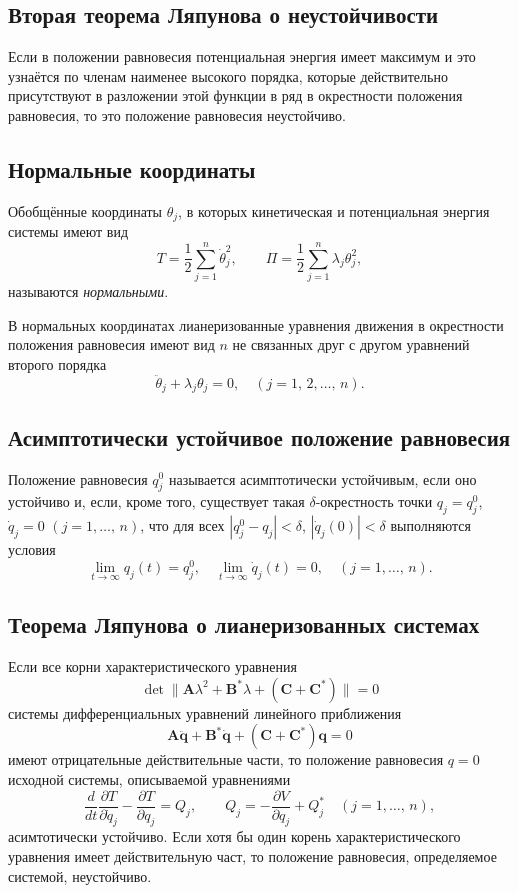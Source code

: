 \documentclass[a4paper,12pt]{article}
\begin{document}
\subsection{Вторая теорема Ляпунова о неустойчивости}
\begin{thm}[Ляпунова, 2-я]
	Если в положении равновесия потенциальная энергия имеет максимум и
	это узнаётся по членам наименее высокого порядка, которые действительно
	присутствуют в разложении этой функции в ряд в окрестности положения
	равновесия, то это положение равновесия неустойчиво.
\end{thm}
\subsection{Нормальные координаты}
\begin{dfn}
	Обобщённые координаты $\theta_j$, в которых кинетическая и потенциальная
	энергия системы имеют вид
	\[
		T=\frac{1}{2} \sum_{j=1}^{n} \dot{\theta}_j^2, \qquad
		\Pi=\frac{1}{2} \sum_{j=1}^{n} \lambda_j \theta_j^2,
	\]
	называются \emph{нормальными}.
\end{dfn}
В нормальных координатах лианеризованные уравнения движения в окрестности
положения равновесия имеют вид $n$ не связанных друг с другом уравнений
второго порядка
\[
	\ddot{\theta}_j+\lambda_j \theta_j =0, \quad (j =1,\,2,\ldots,\,n)
.\] 
\subsection{Асимптотически устойчивое положение равновесия}
\begin{dfn}
	Положение равновесия $q_j^0$ называется асимптотически устойчивым,
	если оно устойчиво и, если, кроме того, существует такая 
	$\delta$-окрестность точки $q_j=q_j^0$, $\dot{q}_j=0$ $(j=1,\ldots,\,n)$,
	что для всех $|q_j^0-q_j|<\delta$, $|\dot{q}_j(0)|< \delta$ выполняются
	условия
	\[
		\lim_{t \to \infty} q_j (t)=q_j^0, \quad \lim_{t \to \infty} 
		\dot{q}_j(t)=0,\quad (j=1,\ldots,\,n)
	.\] 
\end{dfn}
\subsection{Теорема Ляпунова о лианеризованных системах}
\begin{thm}
	Если все корни характеристического уравнения
\[
	\det \|\mathbf{A}\lambda^2+\mathbf{B}^* \lambda +(\mathbf{C}+
	\mathbf{C}^*)\|=0
\]
системы дифференциальных уравнений линейного приближения
\[
	\mathbf{A}\ddot{\mathbf{q}}+\mathbf{B}^* \dot{\mathbf{q}}+
	(\mathbf{C}+\mathbf{C}^*)\mathbf{q}=0
\]
имеют отрицательные действительные части, то положение равновесия  $q=0$
исходной системы, описываемой уравнениями
\[
	\frac{d}{dt} \frac{\partial T}{\partial \dot{q}_j} -\frac{\partial T}{\partial q_j} =
	Q_j,\qquad Q_j=-\frac{\partial V}{\partial q_j} +Q_j^* \quad (j=1,\ldots,
	\,n)
,\] 
асимтотически устойчиво. Если хотя бы один корень характеристического уравнения
имеет действительную част, то положение равновесия, определяемое системой,
неустойчиво.
\end{thm}
\end{document}
